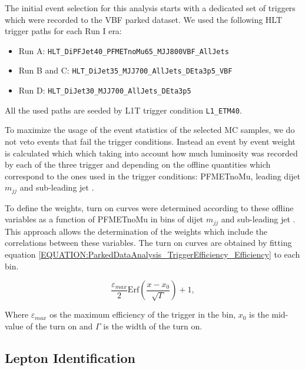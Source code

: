 
The initial event selection for this analysis starts with a dedicated set of triggers which were recorded to the \gls{VBF} parked dataset. We used the following \gls{HLT} trigger paths for each Run I era:

\begin{itemize}
  \item Run A:       \verb!HLT_DiPFJet40_PFMETnoMu65_MJJ800VBF_AllJets!
  \item Run B and C: \verb!HLT_DiJet35_MJJ700_AllJets_DEta3p5_VBF!
  \item Run D:       \verb!HLT_DiJet30_MJJ700_AllJets_DEta3p5!
\end{itemize}

All the used paths are seeded by \gls{L1T} trigger condition \verb!L1_ETM40!. 

To maximize the usage of the event statistics of the selected \gls{MC} samples, we do not veto events that fail the trigger conditions. Instead an event by event weight is calculated which which taking into account how much luminosity was recorded by each of the three trigger and depending on the offline quantities which correspond to the ones used in the trigger conditions: PFMETnoMu, leading dijet $m_{jj}$ and sub-leading jet \pt. 

To define the weights, turn on curves were determined according to these offline variables as a function of PFMETnoMu in bins of dijet $m_{jj}$ and sub-leading jet \pt. This approach allows the determination of the weights which include the correlations between these variables. The turn on curves are obtained by fitting equation \ref{EQUATION:ParkedDataAnalysis_TriggerEfficiency_Efficiency} to each bin.

\begin{equation}
\frac{\varepsilon_{max}}{2}\text{Erf}\left(\frac{x-x_{0}}{\sqrt{\Gamma}}\right)+1,
\label{EQUATION:ParkedDataAnalysis_TriggerEfficiency_Efficiency} 
\end{equation}

Where $\varepsilon_{max}$ os the maximum efficiency of the trigger in the bin, $x_{0}$ is the mid-value of the turn on and $\Gamma$ is the width of the turn on.

\subsection{Lepton Identification}

